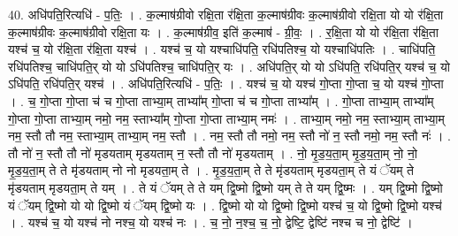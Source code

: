 \documentclass[17pt]{extarticle}
\begin{document}
40. अधि॑पति॒रित्यधि॑ - प॒तिः॒ । . क॒ल्माष॑ग्रीवो रक्षि॒ता र॑क्षि॒ता क॒ल्माष॑ग्रीवः क॒ल्माष॑ग्रीवो रक्षि॒ता यो यो र॑क्षि॒ता क॒ल्माष॑ग्रीवः क॒ल्माष॑ग्रीवो रक्षि॒ता यः । . क॒ल्माष॑ग्रीव॒ इति॑ क॒ल्माष॑ - ग्री॒वः॒ । . र॒क्षि॒ता यो यो र॑क्षि॒ता र॑क्षि॒ता यश्च॑ च॒ यो र॑क्षि॒ता र॑क्षि॒ता यश्च॑ । . यश्च॑ च॒ यो यश्चाधि॑पति॒ रधि॑पतिश्च॒ यो यश्चाधि॑पतिः । . चाधि॑पति॒ रधि॑पतिश्च॒ चाधि॑पति॒र् यो यो ऽधि॑पतिश्च॒ चाधि॑पति॒र् यः । . अधि॑पति॒र् यो यो ऽधि॑पति॒ रधि॑पति॒र् यश्च॑ च॒ यो ऽधि॑पति॒ रधि॑पति॒र् यश्च॑ । . अधि॑पति॒रित्यधि॑ - प॒तिः॒ । . यश्च॑ च॒ यो यश्च॑ गो॒प्ता गो॒प्ता च॒ यो यश्च॑ गो॒प्ता । . च॒ गो॒प्ता गो॒प्ता च॑ च गो॒प्ता ताभ्या॒म् ताभ्या᳚म् गो॒प्ता च॑ च गो॒प्ता ताभ्या᳚म् । . गो॒प्ता ताभ्या॒म् ताभ्या᳚म् गो॒प्ता गो॒प्ता ताभ्या॒म् नमो॒ नम॒ स्ताभ्या᳚म् गो॒प्ता गो॒प्ता ताभ्या॒म् नमः॑ । . ताभ्या॒म् नमो॒ नम॒ स्ताभ्या॒म् ताभ्या॒म् नम॒ स्तौ तौ नम॒ स्ताभ्या॒म् ताभ्या॒म् नम॒ स्तौ । . नम॒ स्तौ तौ नमो॒ नम॒ स्तौ नो॑ न॒ स्तौ नमो॒ नम॒ स्तौ नः॑ । . तौ नो॑ न॒ स्तौ तौ नो॑ मृडयताम् मृडयताम् न॒ स्तौ तौ नो॑ मृडयताम् । . नो॒ मृ॒ड॒य॒ता॒म् मृ॒ड॒य॒ता॒म् नो॒ नो॒ मृ॒ड॒य॒ता॒म् ते ते मृ॑डयताम् नो नो मृडयता॒म् ते । . मृ॒ड॒य॒ता॒म् ते ते मृ॑डयताम् मृडयता॒म् ते यं ॅयम् ते मृ॑डयताम् मृडयता॒म् ते यम् । . ते यं ॅयम् ते ते यम् द्वि॒ष्मो द्वि॒ष्मो यम् ते ते यम् द्वि॒ष्मः । . यम् द्वि॒ष्मो द्वि॒ष्मो यं ॅयम् द्वि॒ष्मो यो यो द्वि॒ष्मो यं ॅयम् द्वि॒ष्मो यः । . द्वि॒ष्मो यो यो द्वि॒ष्मो द्वि॒ष्मो यश्च॑ च॒ यो द्वि॒ष्मो द्वि॒ष्मो यश्च॑ । . यश्च॑ च॒ यो यश्च॑ नो नश्च॒ यो यश्च॑ नः । . च॒ नो॒ न॒श्च॒ च॒ नो॒ द्वेष्टि॒ द्वेष्टि॑ नश्च च नो॒ द्वेष्टि॑ । \newline
\pagebreak
{}
\end{document}
